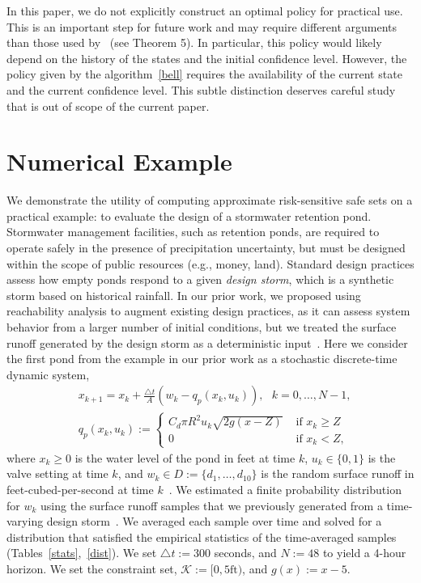 \documentclass[letterpaper, 10 pt, conference]{ieeeconf}  %
\begin{document}
In this paper, we do not explicitly construct an optimal policy for practical use.
This is an important step for future work and may require different arguments 
than those used by~\cite{chow2015risk} (see Theorem 5). In particular, this policy would likely depend 
on the history of the states and the initial confidence level. However, the policy given by the algorithm~\eqref{bell}
requires the availability of the current state and the current confidence level. 
This subtle distinction deserves careful study that is out of scope of the current paper.

\section{Numerical Example}\label{ex}
We demonstrate the utility of computing approximate risk-sensitive safe sets on a practical example:
to evaluate the design of a stormwater retention pond. 
Stormwater management facilities, such as retention ponds, are required to operate safely 
in the presence of precipitation uncertainty, but must be designed within the scope of public resources (e.g., money, land). 
Standard design practices assess how empty ponds respond to a given \textit{design storm},
which is a synthetic storm based on historical rainfall.  
In our prior work, we proposed using reachability analysis to augment existing design practices, as it can assess 
system behavior from a larger number of initial conditions, but we treated the surface runoff generated by the design storm as a deterministic input~\cite{sustech}.
Here we consider the first pond from the example in our prior work as a stochastic discrete-time dynamic system,
\begin{equation}\begin{aligned}
& x_{k+1} = x_k + \frac{\triangle t}{A} (w_k - q_p(x_k, u_k)), \text{ }k = 0, \dots, N-1, \\
& q_p(x_k,u_k) := \begin{cases} C_d \pi R^2 u_k \sqrt{ 2g(x-Z) } & \text{ if } x_k \geq Z \\
						0 & \text{ if } x_k < Z, \end{cases}
\end{aligned}\label{watersys}\end{equation}
where $x_k \geq 0$ is the water level of the pond in feet at time $k$, $u_k \in \{0, 1\}$ is the valve setting at time $k$,
and $w_k \in D := \{d_1, \dots, d_{10}\}$ is the random surface runoff in feet-cubed-per-second at time $k$~\cite{sustech}.\footnotemark
{} 
We estimated a finite probability distribution for $w_k$ using the surface runoff samples that we previously generated from a time-varying design storm~\cite{sustech}. 
We averaged each sample over time and solved for a distribution
that satisfied the empirical statistics of the time-averaged samples (Tables~\ref{stats},~\ref{dist}). 
We set $\triangle t := 300$ seconds, and $N := 48$ to yield a 4-hour horizon.
We set the constraint set, $\mathcal{K} := [0, 5\text{ft})$, and $g(x) := x - 5$.
\end{document}
